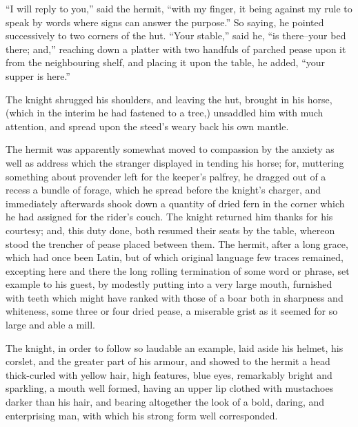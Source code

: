 ``I will reply to you,'' said the hermit, ``with my finger, it being
against my rule to speak by words where signs can answer the purpose.''
So saying, he pointed successively to two corners of the hut. ``Your
stable,'' said he, ``is there--your bed there; and,'' reaching down a
platter with two handfuls of parched pease upon it from the neighbouring
shelf, and placing it upon the table, he added, ``your supper is here.''

The knight shrugged his shoulders, and leaving the hut, brought in his
horse, (which in the interim he had fastened to a tree,) unsaddled him
with much attention, and spread upon the steed's weary back his own
mantle.

The hermit was apparently somewhat moved to compassion by the anxiety as
well as address which the stranger displayed in tending his horse; for,
muttering something about provender left for the keeper's palfrey, he
dragged out of a recess a bundle of forage, which he spread before the
knight's charger, and immediately afterwards shook down a quantity of
dried fern in the corner which he had assigned for the rider's couch.
The knight returned him thanks for his courtesy; and, this duty done,
both resumed their seats by the table, whereon stood the trencher of
pease placed between them. The hermit, after a long grace, which had
once been Latin, but of which original language few traces remained,
excepting here and there the long rolling termination of some word or
phrase, set example to his guest, by modestly putting into a very large
mouth, furnished with teeth which might have ranked with those of a boar
both in sharpness and whiteness, some three or four dried pease, a
miserable grist as it seemed for so large and able a mill.

The knight, in order to follow so laudable an example, laid aside his
helmet, his corslet, and the greater part of his armour, and showed to
the hermit a head thick-curled with yellow hair, high features, blue
eyes, remarkably bright and sparkling, a mouth well formed, having an
upper lip clothed with mustachoes darker than his hair, and bearing
altogether the look of a bold, daring, and enterprising man, with which
his strong form well corresponded.

